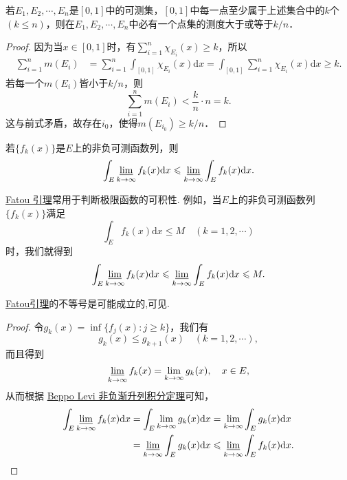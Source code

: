 \documentclass[../../main.tex]{subfiles}
\begin{document}
\begin{example}
若\(E_1, E_2, \cdots, E_n\)是\([0, 1]\)中的可测集，\([0, 1]\)中每一点至少属于上述集合中的\(k\)个\((k \leqslant n)\)，则在\(E_1, E_2, \cdots, E_n\)中必有一个点集的测度大于或等于\(k / n\)．
\end{example}
\begin{proof}
因为当\(x \in [0, 1]\)时，有\(\sum_{i = 1}^{n} \chi_{E_i}(x) \geqslant k\)，所以
\begin{align*}
\sum_{i = 1}^{n} m(E_i) &= \sum_{i = 1}^{n} \int_{[0, 1]} \chi_{E_i}(x) \mathrm{d}x = \int_{[0, 1]} \sum_{i = 1}^{n} \chi_{E_i}(x) \mathrm{d}x \geqslant k.
\end{align*}
若每一个\(m(E_i)\)皆小于\(k / n\)，则
\[
\sum_{i = 1}^{n} m(E_i) < \frac{k}{n} \cdot n = k.
\]
这与前式矛盾，故存在\(i_0\)，使得\(m(E_{i_0}) \geqslant k / n\)． 
\end{proof}

\begin{theorem}[Fatou引理]\label{lemma:Fatou引理}
若\(\{f_k(x)\}\)是\(E\)上的非负可测函数列，则
\begin{align*}
\int_E \varliminf_{k \to \infty} f_k(x) \mathrm{d}x \leqslant \varliminf_{k \to \infty} \int_E f_k(x) \mathrm{d}x. 
\end{align*}
\end{theorem}
\begin{note}
\hyperref[lemma:Fatou引理]{Fatou 引理}常用于判断极限函数的可积性. 例如，当\(E\)上的非负可测函数列\(\{f_k(x)\}\)满足
\[
\int_E f_k(x) \mathrm{d}x \leqslant M \quad (k = 1, 2, \cdots)
\]
时，我们就得到
\[
\int_E \varliminf_{k \to \infty} f_k(x) \mathrm{d}x \leqslant \varliminf_{k \to \infty} \int_E f_k(x) \mathrm{d}x\leqslant M.
\] 
\end{note}
\begin{remark}
\hyperref[lemma:Fatou引理]{Fatou引理}的不等号是可能成立的,可见.
\end{remark}
\begin{proof}
令\(g_k(x) = \inf\{f_j(x): j \geqslant k\}\)，我们有
\[
g_k(x) \leqslant g_{k + 1}(x) \quad (k = 1, 2, \cdots),
\]
而且得到
\[
\varliminf_{k \to \infty} f_k(x) = \lim_{k \to \infty} g_k(x), \quad x \in E,
\]
从而根据 \hyperref[theorem:Beppo Levi非负渐升列积分定理]{Beppo Levi 非负渐升列积分定理}可知，
\begin{align*}
\int_E \varliminf_{k \to \infty} f_k(x) \mathrm{d}x &= \int_E \lim_{k \to \infty} g_k(x) \mathrm{d}x = \lim_{k \to \infty} \int_E g_k(x) \mathrm{d}x \\
&= \varliminf_{k \to \infty} \int_E g_k(x) \mathrm{d}x \leqslant \varliminf_{k \to \infty} \int_E f_k(x) \mathrm{d}x.
\end{align*}
\end{proof}
\end{document}
